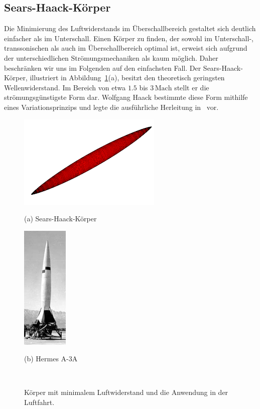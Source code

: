 \subsection{Sears-Haack-Körper}
Die Minimierung des Luftwiderstands im Überschallbereich 
gestaltet sich deutlich einfacher als im Unterschall. 
Einen Körper zu finden, der sowohl im Unterschall-, 
transsonischen als auch im Überschallbereich optimal ist, 
erweist sich aufgrund der unterschiedlichen 
Strömungsmechaniken als kaum möglich.
Daher beschränken wir uns im Folgenden auf den einfachsten Fall.
Der Sears-Haack-Körper, illustriert in Abbildung~\ref{fig:sears_haack}(a), 
besitzt den theoretisch geringsten Wellenwiderstand. 
Im Bereich von etwa $1.5$ bis $3\,\mathrm{Mach}$ 
stellt er die strömungsgünstigste Form dar. 
Wolfgang Haack bestimmte diese Form mithilfe eines 
Variationsprinzips und legte die ausführliche Herleitung 
in~\cite{Haack1941} vor.
\begin{figure}
    \centering
    \begin{minipage}[t]{0.48\textwidth}
       \centering
        \includegraphics[height=4.5cm]{papers/ueberschall/figures/Sears-Haack.png}
        \caption*{(a) Sears-Haack-Körper~\cite{SearsHaackWikipedia}}
    \end{minipage}
    \hfill
    \begin{minipage}[t]{0.48\textwidth}
        \centering
        \includegraphics[height=6cm]{papers/ueberschall/figures/hermes-a3a.jpg}
        \caption*{(b) Hermes A-3A~\cite{WeebauHermesA3A}}
    \end{minipage}
    \caption{Körper mit minimalem Luftwiderstand und die Anwendung in der Luftfahrt.}
    ~\label{fig:sears_haack}
\end{figure}
